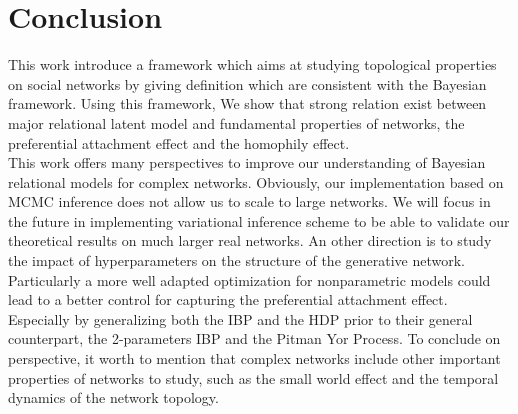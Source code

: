 \section{Conclusion}
\label{sec:concl}

This work introduce a framework which aims at studying topological properties on social networks by giving definition which are consistent with the Bayesian framework. Using this framework, We show that strong relation exist between major relational latent model and fundamental properties of networks, the preferential attachment effect and the homophily effect.~\\ 

This work offers many perspectives to improve our understanding of Bayesian relational models for complex networks. Obviously, our implementation based on MCMC inference does not allow us to scale to large networks. We will focus in the future in implementing variational inference scheme to be able to validate our theoretical results on much larger real networks. An other direction is to study the impact of hyperparameters on the structure of the generative network. Particularly a more well adapted optimization for nonparametric models could lead to a better control for capturing the preferential attachment effect. Especially by generalizing both the IBP and the HDP prior to their general counterpart, the 2-parameters IBP and the Pitman Yor Process. To conclude on perspective, it worth to mention that complex networks include other important properties of networks to study, such as the small world effect and the temporal dynamics of the network topology.
